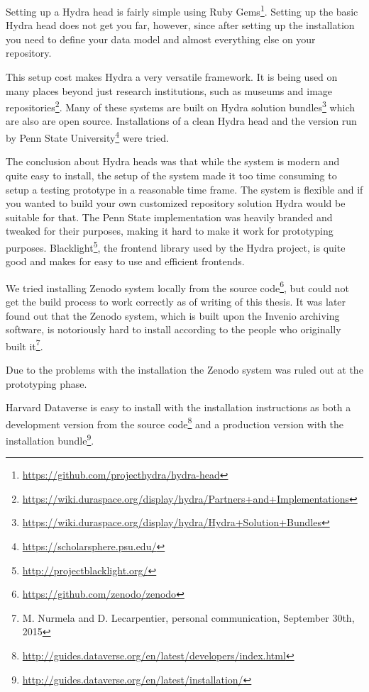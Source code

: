 Setting up a Hydra head is fairly simple using Ruby
Gems\footnote{\url{https://github.com/projecthydra/hydra-head}}.
Setting up the basic Hydra head
does not get you far, however, since after setting up the installation you need
to define your data model and almost everything else on your repository.

This setup cost makes Hydra a very versatile framework. It is being used on many
places beyond just research institutions, such as museums and image
repositories\footnote{\url{https://wiki.duraspace.org/display/hydra/Partners+and+Implementations}}.
Many of these systems are built on Hydra solution
bundles\footnote{\url{https://wiki.duraspace.org/display/hydra/Hydra+Solution+Bundles}}
which are also
are open source. Installations of a clean Hydra head and the version
run by Penn State University\footnote{\url{https://scholarsphere.psu.edu/}} were tried.

The conclusion about Hydra heads was that while the system is modern and quite
easy to install, the setup of the system made it too time consuming to setup a
testing prototype in a reasonable time frame. The system is flexible and if you
wanted to build your own customized repository solution Hydra would be suitable
for that. The Penn State implementation was heavily branded and tweaked for
their purposes, making it hard to make it work for prototyping purposes.
Blacklight\footnote{\url{http://projectblacklight.org/}},
the frontend library used by the Hydra
project, is quite good and makes for easy to use and efficient frontends.

We tried installing Zenodo system locally from the source
code\footnote{\url{https://github.com/zenodo/zenodo}}, but could not get the
build process to work correctly as of writing of this thesis.
It was later found out that the Zenodo system, which is built upon the Invenio
archiving software, is notoriously hard to install according to the people who
originally built it\footnote{M. Nurmela and D. Lecarpentier, personal
communication, September 30th, 2015}.

Due to the problems with the installation the Zenodo system was ruled out at
the prototyping phase.

Harvard Dataverse is easy to install with the installation instructions as
both a development version from the source
code\footnote{\url{http://guides.dataverse.org/en/latest/developers/index.html}} and a
production version with
the installation bundle\footnote{\url{http://guides.dataverse.org/en/latest/installation/}}.

